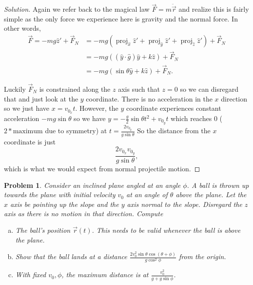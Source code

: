 \documentclass{article}
\theoremstyle{norm}
\newtheorem{prb}[thm]{Problem}
\DeclareMathOperator{\proj}{proj}
\begin{document}
\begin{proof}[Solution]
Again we refer back to the magical law $\vec{F} = m \ddot{\vec{r}}$ and
realize this is fairly simple as the only force we experience here is
gravity and the normal force. In other words,
\[ \begin{aligned}
\vec{F} = -mg \hat{z}' + \vec{F}_N &= -mg(\proj_{\hat{x}} \hat{z}' +
\proj_{\hat{y}} \hat{z}' + \proj_{\hat{z}} \hat{z}') + \vec{F}_N \\
&= -mg\left( (\hat{y} \cdot \hat{g}) \hat{y} + k \hat{z} \right) +
\vec{F}_N \\
&= -mg \left( \sin \theta \hat{y} + k \hat{z} \right) + \vec{F}_N.
\end{aligned} \]

Luckily $\vec{F}_N$ is constrained along the $z$ axis such that $z = 0$
so we can disregard that and just look at the $y$ coordinate. There is
no acceleration in the $x$ direction so we just have $x = v_{0_x} t$.
However, the $y$ coordinate experiences constant acceleration $-mg \sin
\theta$ so we have $y = - \frac{g}{2} \sin \theta t^2 + v_{0_y} t$ which
reaches $0$ ($2 * \textrm{maximum}$ due to symmetry) at $t = \frac{2
v_{0_y}}{g \sin \theta}$ So the distance from the $x$ coordinate is just
\[ \boxed{\frac{2 v_{0_x} v_{0_y}}{g \sin \theta}}, \]
which is what we would expect from normal projectile motion.
\end{proof}

\begin{prb}
Consider an inclined plane angled at an angle $\phi$. A ball is thrown
up towards the plane with initial velocity $v_0$ at an angle of $\theta$
above the plane. Let the $x$ axis be pointing up the slope and the $y$
axis normal to the slope. Disregard the $z$ axis as there is no motion
in that direction. Compute

\begin{enumerate}[(a)]
\item The ball's position $\vec{r}(t)$. This needs to be valid whenever
the ball is above the plane.
\item Show that the ball lands at a distance $\frac{2 v_0^2 \sin \theta
\cos (\theta + \phi)}{g \cos^2 \phi}$ from the origin.
\item With fixed $v_0, \phi$, the maximum distance is at $\frac{v_0^2}{g
+ g \sin \phi}$.
\end{enumerate}
\end{prb}
\end{document}
